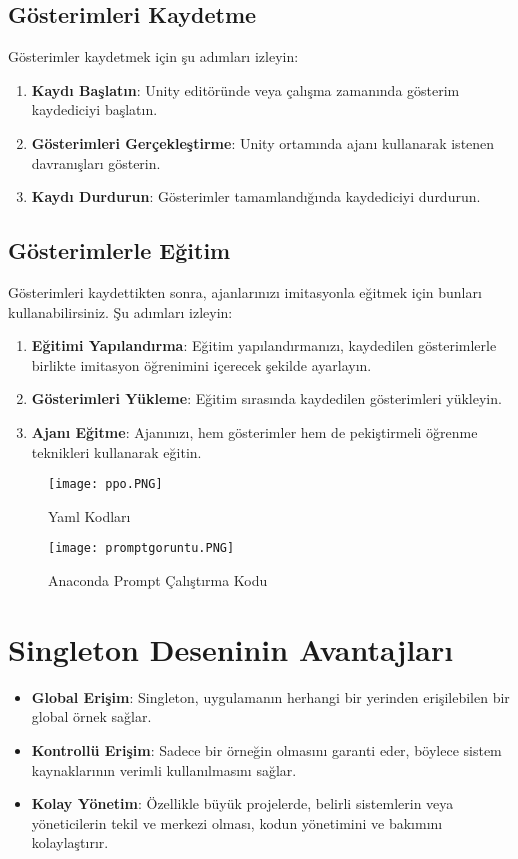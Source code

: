 \documentclass{article}
\begin{document}
\subsection{Gösterimleri Kaydetme}
Gösterimler kaydetmek için şu adımları izleyin:

\begin{enumerate}
\item \textbf{Kaydı Başlatın}: Unity editöründe veya çalışma zamanında gösterim kaydediciyi başlatın.
\item \textbf{Gösterimleri Gerçekleştirme}: Unity ortamında ajanı kullanarak istenen davranışları gösterin.
\item \textbf{Kaydı Durdurun}: Gösterimler tamamlandığında kaydediciyi durdurun.
\end{enumerate}

\subsection{Gösterimlerle Eğitim}
Gösterimleri kaydettikten sonra, ajanlarınızı imitasyonla eğitmek için bunları kullanabilirsiniz. Şu adımları izleyin:

\begin{enumerate}
\item \textbf{Eğitimi Yapılandırma}: Eğitim yapılandırmanızı, kaydedilen gösterimlerle birlikte imitasyon öğrenimini içerecek şekilde ayarlayın.
\item \textbf{Gösterimleri Yükleme}: Eğitim sırasında kaydedilen gösterimleri yükleyin.
\item \textbf{Ajanı Eğitme}: Ajanınızı, hem gösterimler hem de pekiştirmeli öğrenme teknikleri kullanarak eğitin.
\end{enumerate}
\begin{figure}[h!]
\centering
\begin{minipage}[b]{0.4\textwidth}
  \texttt{[image: ppo.PNG]}
  \caption{Yaml Kodları}
\end{minipage}
\hfill
\begin{minipage}[b]{0.55\textwidth}
  \texttt{[image: promptgoruntu.PNG]}
  \caption{Anaconda Prompt Çalıştırma Kodu}
\end{minipage}
\end{figure}

\section{Singleton Deseninin Avantajları}
\begin{itemize}
    \item \textbf{Global Erişim}: Singleton, uygulamanın herhangi bir yerinden erişilebilen bir global örnek sağlar.
    \item \textbf{Kontrollü Erişim}: Sadece bir örneğin olmasını garanti eder, böylece sistem kaynaklarının verimli kullanılmasını sağlar.
    \item \textbf{Kolay Yönetim}: Özellikle büyük projelerde, belirli sistemlerin veya yöneticilerin tekil ve merkezi olması, kodun yönetimini ve bakımını kolaylaştırır.
\end{itemize}
\end{document}
